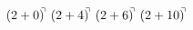 \documentclass[preview]{standalone}
\begin{document}
\begin{align*}
(2+0)^{\hspace{-0.1cm}\urcorner} \ (2+4)^{\hspace{-0.1cm}\urcorner} \ (2+6)^{\hspace{-0.1cm}\urcorner} \ (2+10)^{\hspace{-0.1cm}\urcorner}
\end{align*}
\end{document}
